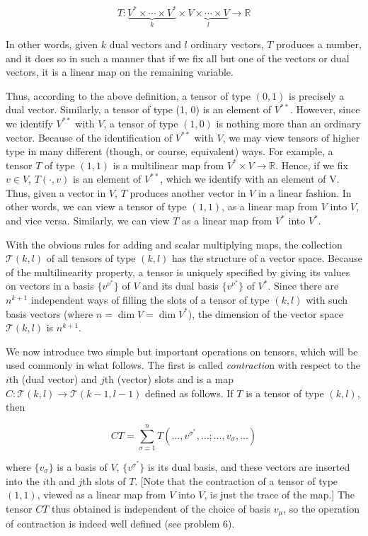\[T:\underset{k}{\underbrace{V^*\times\cdots\times V^*}}\times\underset{l}{\underbrace{V\times\cdots\times V}}\to\mathbb{R}\]

In other words, given $k$ dual vectors and $l$ ordinary vectors, $T$ produces a number, and it does so in such a manner that if we fix all but one of the vectors or dual vectors, it is a linear map on the remaining variable.

Thus, according to the above definition, a tensor of type $(0,1)$ is precisely a dual vector. Similarly, a tensor of type (1, 0) is an element of $V^{**}$. However, since we identify $V^{**}$ with $V$, a tensor of type $(1, 0)$ is nothing more than an ordinary vector. Because of the identification of $V^{**}$ with $V$, we may view tensors of higher type in many different (though, or course, equivalent) ways. For example, a tensor $T$ of type $(1,1)$ is a multilinear map from $V^*\times V\to\mathbb{R}$. Hence, if we fix $v\in V$, $T(\cdot,v)$ is an element of $V^{**}$, which we identify with an element of V. Thus, given a vector in $V$, $T$ produces another vector in $V$ in a linear fashion. In other words, we can view a tensor of type $(1, 1)$, as a linear map from $V$ into $V$, and vice versa. Similarly, we can view $T$ as a linear map from $V^*$ into $V^*$.

With the obvious rules for adding and scalar multiplying maps, the collection $\mathscr{T}(k, l)$ of all tensors of type $(k,l)$ has the structure of a vector space. Because of the multilinearity property, a tensor is uniquely specified by giving its values on vectors in a basis $\{v^{\nu^*}\}$ of $V$ and its dual basis $\{v^{\nu^*}\}$ of $V^*$. Since there are $n^{k+1}$ independent ways of filling the slots of a tensor of type $(k,l)$ with such basis vectors (where $n = \dim V = \dim V^*$), the dimension of the vector space $\mathscr{T}(k,l)$ is $n^{k+1}$.

We now introduce two simple but important operations on tensors, which will be used commonly in what follows. The first is called \emph{contractio}n with respect to the $i$th (dual vector) and $j$th (vector) slots and is a map $C:\mathscr{T}(k,l)\to\mathscr{T}(k-1,l-1)$ defined as follows. If $T$ is a tensor of type $(k,l)$, then

\begin{equation}
    CT=\sum_{\sigma=1}^nT(\ldots,v^{\sigma^*},\ldots;\ldots,v_\sigma,\ldots)
    \label{2.3.2}
\end{equation}

where $\{v_\sigma\}$ is a basis of $V$, $\{v^{\sigma^*}\}$ is its dual basis, and these vectors are inserted into the $i$th and $j$th slots of $T$. [Note that the contraction of a tensor of type $(1, 1)$, viewed as a linear map from $V$ into $V$, is just the trace of the map.] The tensor $CT$ thus obtained is independent of the choice of basis ${v_\mu}$, so the operation of contraction is indeed well defined (see problem 6).

